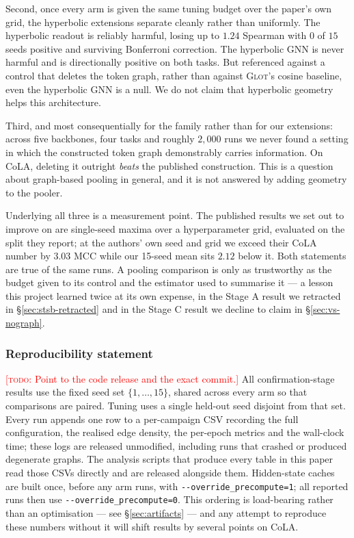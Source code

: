\documentclass{article} %
\newcommand{\TODO}[1]{\textcolor{red}{[\textsc{todo}: #1]}}
\begin{document}
Second, once every arm is given the same tuning budget over the paper's own
grid, the hyperbolic extensions separate cleanly rather than uniformly. The
hyperbolic readout is reliably harmful, losing up to $1.24$ Spearman with $0$ of
$15$ seeds positive and surviving Bonferroni correction. The hyperbolic GNN is
never harmful and is directionally positive on both tasks. But referenced
against a control that deletes the token graph, rather than against
\textsc{Glot}'s cosine baseline, even the hyperbolic GNN is a null. We do not
claim that hyperbolic geometry helps this architecture.

Third, and most consequentially for the family rather than for our extensions:
across five backbones, four tasks and roughly $2{,}000$ runs we never found a
setting in which the constructed token graph demonstrably carries information.
On CoLA, deleting it outright \emph{beats} the published construction. This is
a question about graph-based pooling in general, and it is not answered by
adding geometry to the pooler.

Underlying all three is a measurement point. The published results we set out
to improve on are single-seed maxima over a hyperparameter grid, evaluated on
the split they report; at the authors' own seed and grid we exceed their CoLA
number by $3.03$ MCC while our 15-seed mean sits $2.12$ below it. Both
statements are true of the same runs. A pooling comparison is only as
trustworthy as the budget given to its control and the estimator used to
summarise it --- a lesson this project learned twice at its own expense, in the
Stage A result we retracted in \S\ref{sec:stsb-retracted} and in the Stage C
result we decline to claim in \S\ref{sec:vs-nograph}.

\subsubsection*{Reproducibility statement}
\TODO{Point to the code release and the exact commit.}
All confirmation-stage results use the fixed seed set $\{1,\dots,15\}$, shared
across every arm so that comparisons are paired. Tuning uses a single held-out
seed disjoint from that set. Every run appends one row to a per-campaign CSV
recording the full configuration, the realised edge density, the per-epoch
metrics and the wall-clock time; these logs are released unmodified, including
runs that crashed or produced degenerate graphs. The analysis scripts that
produce every table in this paper read those CSVs directly and are released
alongside them. Hidden-state caches are built once, before any arm runs, with
\texttt{-{}-override\_precompute=1}; all reported runs then use
\texttt{-{}-override\_precompute=0}. This ordering is load-bearing rather than
an optimisation --- see \S\ref{sec:artifacts} --- and any attempt to reproduce
these numbers without it will shift results by several points on CoLA.
\end{document}
